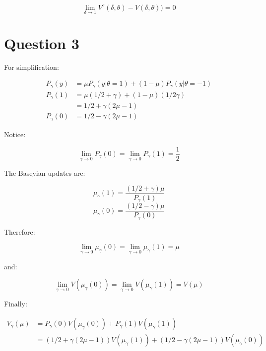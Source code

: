 \documentclass{article}
\begin{document}
\[
  \lim_{\delta \to 1} V^c(\delta, \theta) - V(\delta, \theta)) = 0
\]



\section{Question 3}%
\label{sec:Question 3}

For simplification:

\[
\begin{split}
  P_{\gamma}(y) & = \mu P_{\gamma}(y| \theta = 1) + (1 - \mu)P_{\gamma}(y|\theta = -1) \\
  P_{\gamma}(1) & = \mu (1/2 + \gamma) + (1 - \mu)(1/2 \gamma) \\
                & = 1/2 + \gamma(2\mu - 1) \\
  P_{\gamma}(0) & = 1/2 - \gamma(2\mu - 1)
\end{split}
\]

Notice:

\[
  \lim_{\gamma \to 0} P_{\gamma}(0) = \lim_{\gamma \to 0} P_{\gamma}(1) = \frac{1}{2}
\]

The Baseyian updates are:

\[
  \mu_\gamma(1) = \frac{(1/2 + \gamma)\mu}{P_\gamma(1)}
\]
\[
  \mu_\gamma(0) = \frac{(1/2 - \gamma)\mu}{P_\gamma(0)}
\]

Therefore:

\[
  \lim_{\gamma \to 0} \mu_\gamma(0) = \lim_{\gamma \to 0} \mu_\gamma(1) = \mu
\]

and:

\[
  \lim_{\gamma \to 0} V(\mu_\gamma(0)) = \lim_{\gamma \to 0} V(\mu_\gamma(1)) = V(\mu)
\]



Finally:

\[
\begin{split}
  V_\gamma(\mu) & = P_\gamma(0)V(\mu_\gamma(0)) + P_\gamma(1)V(\mu_\gamma(1)) \\
                & = (1/2 + \gamma(2\mu -1))V(\mu_\gamma(1)) +
                    (1/2 - \gamma(2\mu -1))V(\mu_\gamma(0))
\end{split}
\]
\end{document}
